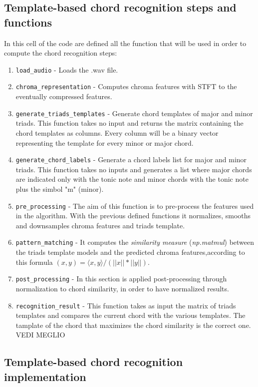 \documentclass[
	12pt, %
]{fphw}
\begin{document}
\subsection*{Template-based chord recognition steps and functions}

In this cell of the code are defined all the function that will be used in order to compute the chord recognition steps:

\begin{enumerate}
	\item \verb|load_audio| - Loads the .wav file.
	\item \verb|chroma_representation| - Computes chroma features with STFT to the eventually compressed features.
	\item \verb|generate_triads_templates| - Generate chord templates of major and minor triads. This function takes no input and returns the matrix containing the chord templates as columns. Every column will be a binary vector representing the template for every minor or major chord.
	\item \verb|generate_chord_labels| - Generate a chord labels list for major and minor triads.
This function takes no inputs and generates a list where major chords are indicated only with the tonic note and minor chords with the tonic note plus the simbol "m" (minor).
	\item \verb|pre_processing| - The aim of this function is to pre-process the features used in the algorithm. With the previous defined functions it normalizes, smooths and downsamples chroma features and triads template.
	\item \verb|pattern_matching| - It computes the \textit{similarity measure} (\textit{np.matmul}) between the triads template models and the predicted chroma features,according to this formula $(x,y)=\langle x,y\rangle/(||x||*||y||)$.
	\item \verb|post_processing| - In this section is applied post-processing through normalization to chord similarity, in order to have normalized results.
	\item \verb|recognition_result| - This function takes as input the matrix of triads templates and compares the current chord with the various templates. The tamplate of the chord that maximizes the chord similarity is the correct one. \color{red} VEDI MEGLIO \color{black}
\end{enumerate}

\subsection*{Template-based chord recognition implementation}
\end{document}
